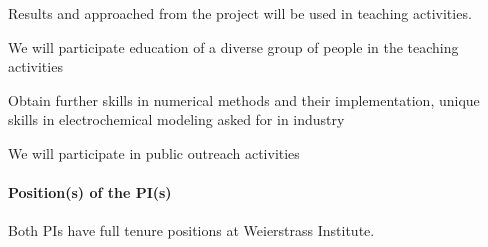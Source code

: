 \documentclass[a4paper,10pt]{article}
\begin{document}
Results and approached from the project will be used in teaching activities.

We will participate education of a diverse group of people in the teaching activities

Obtain further skills in numerical methods and their implementation, unique skills in electrochemical
modeling asked for in  industry

We will participate in public outreach activities

\paragraph{Position(s) of the PI(s)}
Both PIs have full tenure positions at Weierstrass Institute.
\end{document}
